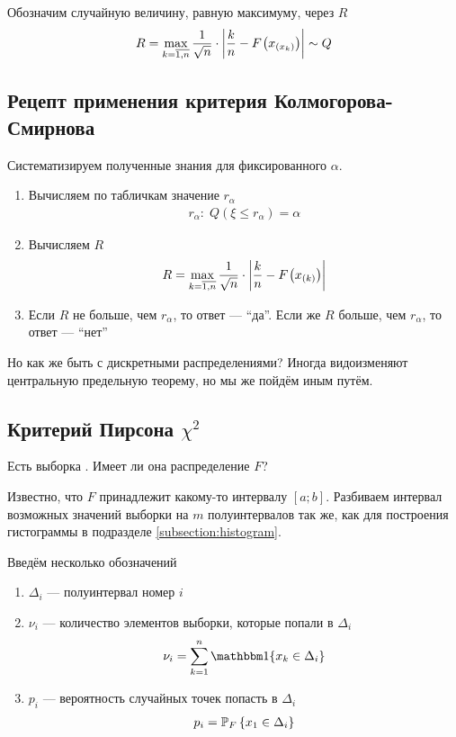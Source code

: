 Обозначим случайную величину, равную максимуму, через $R$
\begin{align*}
  R = \max\limits_{k=\overline{1,n}}{
      \frac{1}{\sqrt{n}} \cdot \left| \frac{k}{n}
      - \cdf{x_{\left( x_k \right)}} \right|}
  \sim Q
\end{align*}

\subsection{Рецепт применения критерия Колмогорова-Смирнова}

Систематизируем полученные знания для фиксированного $\alpha$.

\begin{enumerate}
  \item Вычисляем по табличкам значение $r_{\alpha}$
      \begin{align*}
      r_{\alpha}:\; Q\left( \xi \le r_{\alpha} \right) = \alpha
      \end{align*}
  \item Вычисляем $R$
      \begin{align*}
      R = \max\limits_{k=\overline{1,n}}{
          \frac{1}{\sqrt{n}} \cdot \left| \frac{k}{n}
        - \cdf{x_{\left( k \right)}} \right|}
      \end{align*}
  \item Если $R$ не больше, чем $r_{\alpha}$, то ответ --- ``да''.
      Если же $R$ больше, чем $r_{\alpha}$, то ответ --- ``нет''
\end{enumerate}

Но как же быть с дискретными распределениями? Иногда видоизменяют центральную
предельную теорему, но мы же пойдём иным путём.

\subsection{Критерий Пирсона $\chi^2$}

Есть выборка \xsample. Имеет ли она распределение $F$?

Известно, что $F$ принадлежит какому-то интервалу $\left[ a; b \right]$.
Разбиваем интервал возможных значений выборки на $m$ полуинтервалов
так же, как для построения гистограммы в подразделе \ref{subsection:histogram}.

Введём несколько обозначений
\begin{enumerate}
  \item $\Delta_i$ --- полуинтервал номер $i$
  \item $\nu_i$ --- количество элементов выборки, которые попали в $\Delta_i$
      \begin{align*}
      \nu_i = \sum_{k=1}^{n} \Indicator{x_k \in \Delta_i}
      \end{align*}
  \item $p_i$ --- вероятность случайных точек попасть в $\Delta_i$
      \begin{align*}
      p_i = \Probability[F]{x_1 \in \Delta_i}
      \end{align*}
\end{enumerate}

